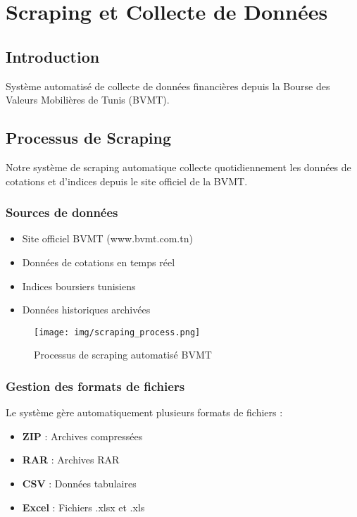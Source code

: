 \section{Scraping et Collecte de Données}

\subsection{Introduction}
Système automatisé de collecte de données financières depuis la Bourse des Valeurs Mobilières de Tunis (BVMT).

\subsection{Processus de Scraping}
Notre système de scraping automatique collecte quotidiennement les données de cotations et d'indices depuis le site officiel de la BVMT.

\subsubsection{Sources de données}
\begin{itemize}
    \item Site officiel BVMT (www.bvmt.com.tn)
    \item Données de cotations en temps réel
    \item Indices boursiers tunisiens
    \item Données historiques archivées
\end{itemize}

\begin{figure}[H]
    \centering
    \texttt{[image: img/scraping\_process.png]}
    \caption{Processus de scraping automatisé BVMT}
    \label{fig:scraping_process}
\end{figure}

\subsubsection{Gestion des formats de fichiers}
Le système gère automatiquement plusieurs formats de fichiers :
\begin{itemize}
    \item \textbf{ZIP} : Archives compressées
    \item \textbf{RAR} : Archives RAR
    \item \textbf{CSV} : Données tabulaires
    \item \textbf{Excel} : Fichiers .xlsx et .xls
\end{itemize}


